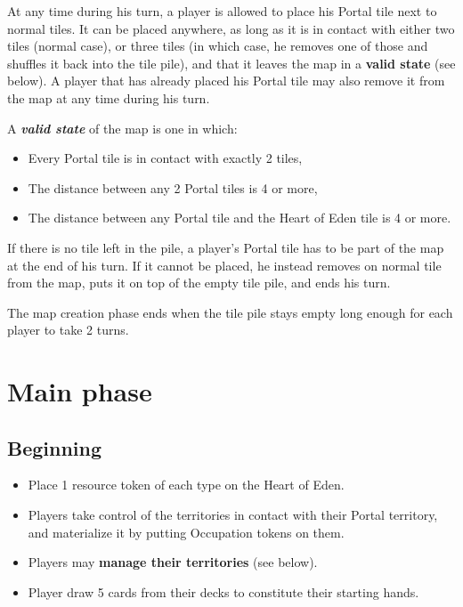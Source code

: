 \documentclass[a4paper]{article}
\begin{document}
    At any time during his turn, a player is allowed to place his Portal tile
    next to normal tiles.
    It can be placed anywhere, as long as it is in contact with either two tiles
    (normal case), or three tiles (in which case, he removes one of those and shuffles
    it back into the tile pile), and that it leaves the map in a \textbf{valid state}
    (see below).
    A player that has already placed his Portal tile may also remove it from the map at
    any time during his turn.    
    
    A \textbf{\textit{valid state}} of the map is one in which:
    \vspace{-1.3em}
    \begin{itemize}
        \item Every Portal tile is in contact with exactly 2 tiles,
        \item The distance between any 2 Portal tiles is 4 or more,
        \item The distance between any Portal tile and the Heart of Eden tile
        is 4 or more.
    \end{itemize}
    
    \vspace{-0.7em}
    If there is no tile left in the pile, a player's Portal tile has to be part of the
    map at the end of his turn.
    If it cannot be placed, he instead removes on normal tile from the map, puts it on
    top of the empty tile pile, and ends his turn.
    
    The map creation phase ends when the tile pile stays empty long enough for each
    player to take 2 turns.


\newpage
\section{Main phase}

  \subsection{Beginning}
  
  	\begin{itemize}
        \item Place 1 resource token of each type on the Heart of Eden.
        \item Players take control of the territories in contact with their Portal
        territory, and materialize it by putting Occupation tokens on them.
        \item Players may \textbf{manage their territories} (see below).
        \item Player draw 5 cards from their decks to constitute their starting hands.
    \end{itemize}
\end{document}
